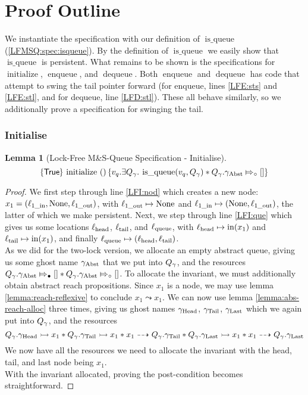 \documentclass[a4paper, 10pt]{report}
\theoremstyle{definition}
\newtheorem{lemma}[theorem]{Lemma}
\newcommand{\initialise}{\operatorname{initialize}}
\newcommand{\enqueue}{\operatorname{enqueue}}
\newcommand{\dequeue}{\operatorname{dequeue}}
\newcommand{\msq}{M\&S-Queue\xspace}
\newcommand{\lfmsq}{Lock-Free \msq}
\newcommand{\isqueue}{\operatorname{is\_queue}}
\newcommand{\vq}{v_q}
\newcommand{\locinM}[1]{\loc_{#1\_\mathrm{in}}}
\newcommand{\locoutM}[1]{\loc_{#1\_\mathrm{out}}}
\newcommand{\locN}[1]{\loc_{\mathrm{#1}}}
\newcommand{\lochead}{\locN{head}}
\newcommand{\loctail}{\locN{tail}}
\newcommand{\locqueue}{\locN{queue}}
\newcommand{\nIn}[1]{\operatorname{in}(#1)}
\newcommand{\node}{x}
\newcommand{\nodeM}[1]{\node_{#1}}
\newcommand{\Qg}{Q_\gname}
\newcommand{\gabst}{\gname_{\mathrm{Abst}}}
\newcommand{\ghead}{\gname_{\mathrm{Head}}}
\newcommand{\gtail}{\gname_{\mathrm{Tail}}}
\newcommand{\glast}{\gname_{\mathrm{Last}}}
\newcommand{\abstractstatefullfrag}[2]{#1 \Mapsto_{\circ} #2}
\newcommand{\abstractstateauth}[2]{#1 \Mapsto_{\bullet} #2}
\newcommand{\reach}[2]{#1 \leadsto #2}
\newcommand{\ar}[2]{#1 \dashrightarrow #2}
\newcommand{\ap}[2]{#1 \rightarrowtail #2}
\newcommand{\tlhocapspecinit}{\hoare{\TRUE}{\initialise \ \TT}{\vq . \Exists \Qg . \isqueue(\vq, \Qg) \star \abstractstatefullfrag{\Qg.\gabst}{[]}}}
\newcommand{\lfhocapspecinit}{\tlhocapspecinit}
\begin{document}
\section{Proof Outline}
\label{LFMSQ:section:proof-outline}

We instantiate the specification with our definition of $\isqueue$ (\ref{LFMSQ:spec:isqueue}). By the definition of $\isqueue$ we easily show that $\isqueue$ is persistent. What remains to be shown is the specifications for $\initialise$, $\enqueue$, and $\dequeue$. Both $\enqueue$ and $\dequeue$ has code that attempt to swing the tail pointer forward (for enqueue, lines \ref{LFE:sts} and \ref{LFE:stl}, and for dequeue, line \ref{LFD:stl}). These all behave similarly, so we additionally prove a specification for swinging the tail.

\subsubsection{Initialise}
\begin{lemma}[\lfmsq Specification - Initialise]\label{LFMSQ:spec:init}
  \begin{equation*}
    \lfhocapspecinit
  \end{equation*}
\end{lemma}
\begin{proof}
We first step through line \ref{LFI:nod} which creates a new node: $\nodeM{1} = (\locinM{1}, \None, \locoutM{1})$, with $\locoutM{1} \mapsto \None$ and $\locinM{1} \mapsto (\None, \locoutM{1})$, the latter of which we make persistent. Next, we step through line \ref{LFI:que} which gives us some locations $\lochead$, $\loctail$, and $\locqueue$, with $\lochead \mapsto \nIn{\nodeM{1}}$ and $\loctail \mapsto \nIn{\nodeM{1}}$, and finally $\locqueue \mapsto (\lochead, \loctail)$.\\
As we did for the two-lock version, we allocate an empty abstract queue, giving us some ghost name $\gabst$ that we put into $\Qg$, and the resources $\abstractstateauth{\Qg.\gabst}{[]} \star \abstractstatefullfrag{\Qg.\gabst}{[]}$. To allocate the invariant, we must additionally obtain abstract reach propositions. Since $\nodeM{1}$ is a node, we may use lemma \ref{lemma:reach-reflexive} to conclude $\reach{\nodeM{1}}{\nodeM{1}}$. We can now use lemma \ref{lemma:abs-reach-alloc} three times, giving us ghost names $\ghead$, $\gtail$, $\glast$ which we again put into $\Qg$, and the resources
\begin{equation*}
  \ap{\Qg.\ghead}{\nodeM{1}} \star \ap{\Qg.\gtail}{\nodeM{1}} \star \ar{\nodeM{1}}{\Qg.\gtail} \star \ap{\Qg.\glast}{\nodeM{1}} \star \ar{\nodeM{1}}{\Qg.\glast}
\end{equation*}
We now have all the resources we need to allocate the invariant with the head, tail, and last node being $\nodeM{1}$.\\
With the invariant allocated, proving the post-condition becomes straightforward.
\end{proof}
\end{document}
